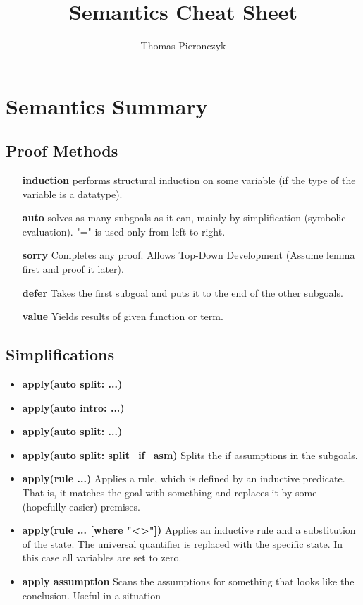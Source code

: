 \documentclass{article}
\title{Semantics Cheat Sheet}
\author{Thomas Pieronczyk}
\begin{document}
\maketitle
\section{Semantics Summary}
\subsection{Proof Methods}
\begin{itemize}
	\item [\textbf{induction}] performs structural induction on some variable (if the type of the variable is a datatype).
	\item [\textbf{auto}] solves as many subgoals as it can, mainly by simplification (symbolic evaluation). "=" is used only from left to right.
	\item [\textbf{sorry}] Completes any proof. Allows Top-Down Development (Assume lemma first and proof it later).
	\item [\textbf{defer}] Takes the first subgoal and puts it to the end of the other subgoals.
	\item [\textbf{value}] Yields results of given function or term.
\end{itemize}

\subsection{Simplifications}

\begin{itemize}
	\item \textbf{apply(auto split: ...)}
	\item \textbf{apply(auto intro: ...)}
	\item \textbf{apply(auto split: ...)}
	\item \textbf{apply(auto split: split\_if\_asm)} Splits the if assumptions in the subgoals.
	\item \textbf{apply(rule ...)} Applies a rule, which is defined by an inductive predicate. That is, it matches the goal with something and replaces it by some (hopefully easier) premises.
	\item \textbf{apply(rule ... [where "\textless\textgreater"])} Applies an inductive rule and a substitution of the state. The universal quantifier is replaced with the specific state. In this case all variables are set to zero.
	\item \textbf{apply assumption} Scans the assumptions for something that looks like the conclusion. Useful in a situation
\end{itemize}
\end{document}
